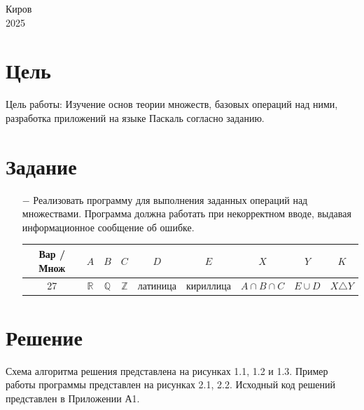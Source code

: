\documentclass[oneside,a4paper,14pt]{extarticle}
\begin{document}
\begin{center}
	Киров\\
	2025
\end{center}

\newpage\thispagestyle{plain}

\section*{Цель}

Цель работы: Изучение основ теории множеств, базовых операций над ними, разработка приложений на языке Паскаль согласно заданию.

\section*{Задание}
\begin{itemize}
	\item[$-$] Реализовать программу для выполнения заданных операций над множествами. Программа должна работать при некорректном вводе, выдавая информационное сообщение об ошибке.
	
	\begin{tabular}{|c|c|c|c|c|c|c|c|c|}
		\hline
		Вар / Множ & $A$  & $B$  & $C$  & $D$      & $E$       & $X$               & $Y$      & $K$             \\
		\hline
		27         & $\mathbb{R}$ & $\mathbb{Q}$ & $\mathbb{Z}$ & латиница & кириллица & $A \cap B \cap C$ & $E \cup D$ & $X \triangle Y$ \\
		\hline
		\end{tabular}
\end{itemize}

\section*{Решение}

Схема алгоритма решения представлена на рисунках 1.1, 1.2 и 1.3. Пример работы программы представлен на рисунках 2.1, 2.2. Исходный код решений представлен в Приложении А1.
\end{document}
